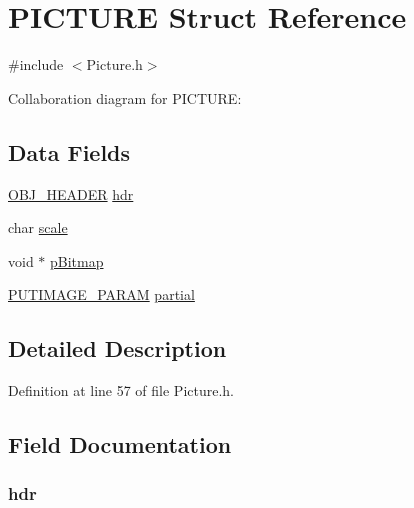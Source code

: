 \hypertarget{struct_p_i_c_t_u_r_e}{}\section{P\+I\+C\+T\+U\+R\+E Struct Reference}
\label{struct_p_i_c_t_u_r_e}


{\ttfamily \#include $<$Picture.\+h$>$}



Collaboration diagram for P\+I\+C\+T\+U\+R\+E\+:
\subsection*{Data Fields}
\begin{DoxyCompactItemize}
\item 
\hyperlink{struct_o_b_j___h_e_a_d_e_r}{O\+B\+J\+\_\+\+H\+E\+A\+D\+E\+R} \hyperlink{struct_p_i_c_t_u_r_e_abeffaf353197a8a64fba6707b68ce0be}{hdr}
\item 
char \hyperlink{struct_p_i_c_t_u_r_e_aa4b3424dc0de08bfe8f637d736c39d31}{scale}
\item 
void $\ast$ \hyperlink{struct_p_i_c_t_u_r_e_aef9bed8e1a29e17226ccbd9a3d81f9e1}{p\+Bitmap}
\item 
\hyperlink{struct_p_u_t_i_m_a_g_e___p_a_r_a_m}{P\+U\+T\+I\+M\+A\+G\+E\+\_\+\+P\+A\+R\+A\+M} \hyperlink{struct_p_i_c_t_u_r_e_a38f3573025aa3c79b8d7091d9e62f8e2}{partial}
\end{DoxyCompactItemize}


\subsection{Detailed Description}


Definition at line 57 of file Picture.\+h.



\subsection{Field Documentation}
\hypertarget{struct_p_i_c_t_u_r_e_abeffaf353197a8a64fba6707b68ce0be}{}
\subsubsection[{hdr}]{ hdr}\label{struct_p_i_c_t_u_r_e_abeffaf353197a8a64fba6707b68ce0be}


